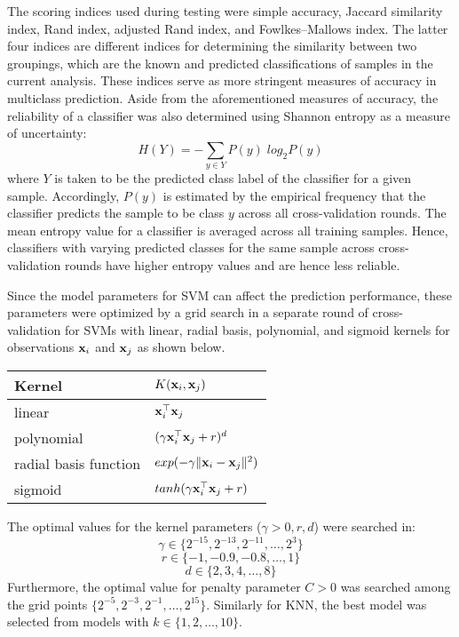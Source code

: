 The scoring indices used during testing were simple accuracy, Jaccard similarity index, Rand index, adjusted Rand index, and Fowlkes–Mallows index. The latter four indices are different indices for determining the similarity between two groupings, which are the known and predicted classifications of samples in the current analysis. These indices serve as more stringent measures of accuracy in multiclass prediction. Aside from the aforementioned measures of accuracy, the reliability of a classifier was also determined using Shannon entropy as a measure of uncertainty:
\[
H(Y) = - \sum_{y \in Y} P(y) \; log_2 P(y)
\]
where $Y$ is taken to be the predicted class label of the classifier for a given sample. Accordingly, $P(y)$ is estimated by the empirical frequency that the classifier predicts the sample to be class $y$ across all cross-validation rounds. The mean entropy value for a classifier is averaged across all training samples.
Hence, classifiers with varying predicted classes for the same sample across cross-validation rounds have higher entropy values and are hence less reliable.

Since the model parameters for SVM can affect the prediction performance, these parameters were optimized by a grid search in a separate round of cross-validation for SVMs with linear, radial basis, polynomial, and sigmoid kernels for observations $\mathbf{x}_i$ and $\mathbf{x}_j$ as shown below.

\begin{table}[h]
	\setlength{\extrarowheight}{0.8em}
	\centering
	\begin{tabular}{l | l}
		\hline
		Kernel & $K(\mathbf{x}_i, \mathbf{x}_j)$ \\
		\hline
		linear & $\mathbf{x}_i^\top \mathbf{x}_j$ \\
		polynomial & $(\gamma \mathbf{x}_i^\top \mathbf{x}_j + r)^d$ \\
		radial basis function & $exp(-\gamma \| \mathbf{x}_i - \mathbf{x}_j \|^2)$ \\
		sigmoid & $tanh(\gamma \mathbf{x}_i^\top \mathbf{x}_j + r)$ \\
		\hline
	\end{tabular}
\end{table}
The optimal values for the kernel parameters ($\gamma > 0, r, d$) were searched in:
\[
\gamma \in \{ 2^{-15}, 2^{-13}, 2^{-11}, \ldots, 2^3 \}
\]
\[
r \in \{ -1, -0.9, -0.8, \ldots, 1 \}
\]
\[
d \in \{2, 3, 4, \ldots, 8 \}
\]
Furthermore, the optimal value for penalty parameter $C > 0$ was searched among the grid points $\{ 2^{-5}, 2^{-3}, 2^{-1}, \ldots, 2^{15} \}$. Similarly for KNN, the best model was selected from models with $k \in \{ 1, 2, \ldots, 10 \}$.

